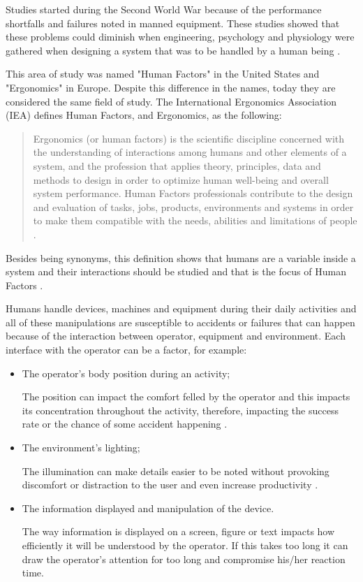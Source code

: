 Studies started during the Second World War because of the performance shortfalls and failures noted in manned equipment. These studies showed that these problems could diminish when engineering, psychology and physiology were gathered when designing a system that was to be handled by a human being \cite{sandom2004human}.

This area of study was named "Human Factors" in the United States and "Ergonomics" in Europe. Despite this difference in the names, today they are considered the same field of study. The International Ergonomics Association (IEA) defines Human Factors, and Ergonomics, as the following:

\begin{quote}
    Ergonomics (or human factors) is the scientific discipline concerned with the understanding of interactions among humans and other elements of a system, and the profession that applies theory, principles, data and methods to design in order to optimize human well-being and overall system performance. Human Factors professionals contribute to the design and evaluation of tasks, jobs, products, environments and systems in order to make them compatible with the needs, abilities and limitations of people \cite{karwowski2012discipline}.
\end{quote}

Besides being synonyms, this definition shows that humans are a variable inside a system and their interactions should be studied and that is the focus of Human Factors \cite{sandom2004human, sanders1998human, dul2003ergonomics}. 

Humans handle devices, machines and equipment during their daily activities and all of these manipulations are susceptible to accidents or failures that can happen because of the interaction between operator, equipment and environment. Each interface with the operator can be a factor, for example:

\begin{itemize}
    \item The operator's body position during an activity;
    
    The position can impact the comfort felled by the operator and this impacts its concentration throughout the activity, therefore, impacting the success rate or the chance of some accident happening \cite{sanders1998human}.
    
    \item The environment's lighting;
    
    The illumination can make details easier to be noted without provoking discomfort or distraction to the user and even increase productivity \cite{sanders1998human}.
    
    \item The information displayed and manipulation of the device.
    
    The way information is displayed on a screen, figure or text impacts how efficiently it will be understood by the operator. If this takes too long it can draw the operator's attention for too long and compromise his/her reaction time.
    
\end{itemize}

